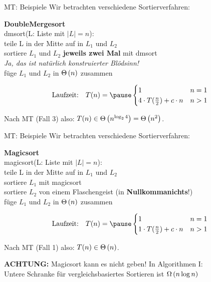 \begin{frame}[t]{MT: Beispiele}
	Wir betrachten verschiedene Sortierverfahren:\\
	\bigskip
	
	\textbf{DoubleMergesort}\\
	dmsort(L: Liste mit $|L| = n$):\\
	\quad teile L in der Mitte auf in $L_1$ und $L_2$\\
	\quad sortiere $L_1$ und $L_2$ \textbf{jeweils zwei Mal} mit dmsort\\
	\qquad \textit{Ja, das ist natürlich konstruierter Blödsinn!}\\
	\quad füge $L_1$ und $L_2$ in $\Theta\left(n\right)$ zusammen\\
	\medskip
	
	$$\text{Laufzeit:} \quad T(n) = \pause \begin{cases}
	1 & n = 1\\
	4 \cdot T(\fract n/2 ) + c \cdot n  & n > 1
	\end{cases}$$
	
	\pause
	Nach MT (Fall 3) also: $T(n) \in \Theta\left(n^{\log_2 4}\right) = \Theta\left(n^2\right)$.
\end{frame}

\begin{frame}[t]{MT: Beispiele}
	Wir betrachten verschiedene Sortierverfahren:\\
	\bigskip
	
	\textbf{Magicsort}\\
	magicsort(L: Liste mit $|L| = n$):\\
	\quad teile L in der Mitte auf in $L_1$ und $L_2$\\
	\quad sortiere $L_1$ mit magicsort\\
	\quad sortiere $L_2$ von einem Flaschengeist (in \textbf{Nullkommanichts}!)\\
	\quad füge $L_1$ und $L_2$ in $\Theta\left(n\right)$ zusammen\\
	\medskip
	
	$$\text{Laufzeit:} \quad T(n) = \pause \begin{cases}
	1 & n = 1\\
	1 \cdot T(\fract n/2 ) + c \cdot n & n > 1
	\end{cases}$$
	
	\pause
	Nach MT (Fall 1) also: $T(n) \in \Theta\left(n\right)$.
	\medskip
	
	\textbf{ACHTUNG:} Magicsort kann es nicht geben! In Algorithmen I:\\ 
	Untere Schranke für vergleichsbasiertes Sortieren ist $\Omega\left(n \log n\right)$
\end{frame}



